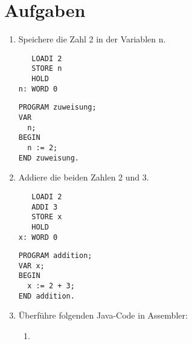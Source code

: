 \documentclass{lehramt-informatik-haupt}
\begin{document}
%

\section{Aufgaben}

\begin{enumerate}

%

\item Speichere die Zahl 2 in der Variablen n.

\begin{multicols}{2}

\begin{verbatim}
   LOADI 2
   STORE n
   HOLD
n: WORD 0
\end{verbatim}

\liSpaltenUmbruch
{}

\begin{verbatim}
PROGRAM zuweisung;
VAR
  n;
BEGIN
  n := 2;
END zuweisung.
\end{verbatim}
\vfill\strut
\end{multicols}

%

\item Addiere die beiden Zahlen 2 und 3.

\begin{multicols}{2}

\begin{verbatim}
   LOADI 2
   ADDI 3
   STORE x
   HOLD
x: WORD 0
\end{verbatim}

\liSpaltenUmbruch
{}

\begin{verbatim}
PROGRAM addition;
VAR x;
BEGIN
  x := 2 + 3;
END addition.
\end{verbatim}
\vfill\strut
\end{multicols}

\item Überführe folgenden Java-Code in Assembler:

\begin{enumerate}

%

\item {}


\end{enumerate}
\end{enumerate}
\end{document}

